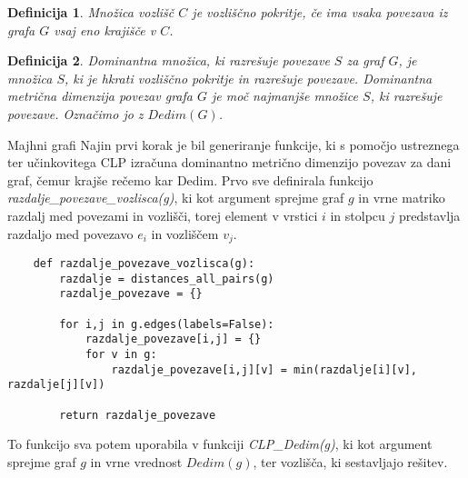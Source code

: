 \documentclass[12pt,a4paper]{amsart}
\makeatletter
\renewcommand\section{\@startsection{section}{1}%
  \z@{.5\linespacing\@plus.7\linespacing}{.5\linespacing}%
  {\normalfont\scshape\large\centering}}
\theoremstyle{plain} %
\newtheorem{definicija}{Definicija}[section]
\makeatother
\begin{document}
    \begin{definicija}
        Množica vozlišč $C$ je \emph{vozliščno pokritje}, če ima vsaka povezava iz grafa $G$ vsaj eno krajišče v $C$.
    \end{definicija}

    \begin{definicija}
        Dominantna množica, ki razrešuje povezave $S$ za graf $G$, je množica $S$, ki je hkrati vozliščno pokritje in razrešuje povezave. Dominantna metrična dimenzija povezav grafa $G$ je moč najmanjše množice $S$, ki razrešuje povezave. Označimo jo z $Dedim(G)$.
    \end{definicija}


\section{Majhni grafi}
    Najin prvi korak je bil generiranje funkcije, ki s pomočjo ustreznega ter učinkovitega CLP izračuna dominantno metrično dimenzijo
    povezav za dani graf, čemur krajše rečemo kar Dedim. Prvo sve definirala funkcijo \\ 
    \emph{razdalje\_povezave\_vozlisca(g)},
    ki kot argument sprejme graf $g$ in vrne matriko razdalj med povezami in vozlišči, torej element v vrstici $i$ in stolpcu $j$ predstavlja razdaljo med povezavo $e_{i}$ in vozliščem $v_{j}$. 

\bigskip
\begin{small}
    \begin{lstlisting}
    def razdalje_povezave_vozlisca(g):
        razdalje = distances_all_pairs(g)
        razdalje_povezave = {}

        for i,j in g.edges(labels=False):
            razdalje_povezave[i,j] = {}
            for v in g:
                razdalje_povezave[i,j][v] = min(razdalje[i][v], razdalje[j][v])

        return razdalje_povezave

    \end{lstlisting}
\end{small}

\bigskip

To funkcijo sva potem uporabila v funkciji \emph{CLP\_Dedim(g)}, ki kot argument sprejme graf $g$ in vrne vrednost $Dedim(g)$, ter
vozlišča, ki sestavljajo rešitev.

\bigskip
\end{document}
